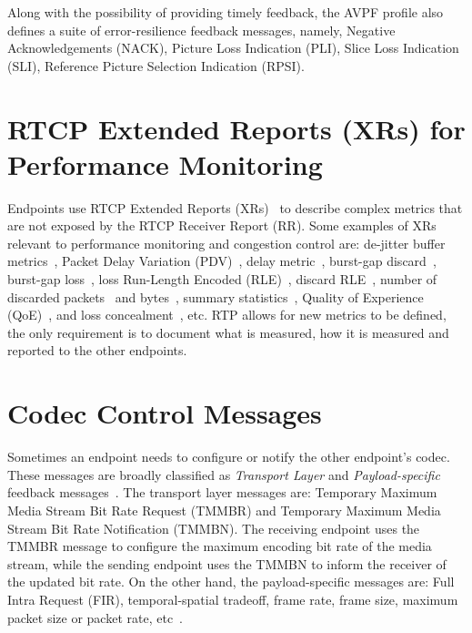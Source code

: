 Along with the possibility of providing timely feedback, the AVPF profile also
defines a suite of error-resilience feedback messages, namely, Negative
Acknowledgements (NACK), Picture Loss Indication (PLI), Slice Loss Indication
(SLI), Reference Picture Selection Indication (RPSI).

\section{RTCP Extended Reports (XRs) for Performance Monitoring}

Endpoints use RTCP Extended Reports (XRs)~\cite{rfc3611} to describe complex
metrics that are not exposed by the RTCP Receiver Report (RR). Some examples
of XRs relevant to performance monitoring and congestion control are:
de-jitter buffer metrics~\cite{draft.xr.jb}, Packet Delay Variation
(PDV)~\cite{rfc6798}, delay metric~\cite{rfc6843}, burst-gap discard~\cite{
draft.xr.bg.discard}, burst-gap loss~\cite{rfc6958}, loss Run-Length Encoded
(RLE)~\cite{rfc3611}, discard RLE~\cite{draft.xr.discard.rle}, number of
discarded packets~\cite{draft.xr.discard} and
bytes~\cite{draft.xr.bytes.discarded}, summary
statistics~\cite{draft.xr.stat}, Quality of Experience
(QoE)~\cite{draft.xr.qoe}, and loss concealment~\cite{draft.xr.conceal}, etc.
RTP allows for new metrics to be defined, the only requirement is to document
what is measured, how it is measured and reported to the other endpoints.




\section{Codec Control Messages}

Sometimes an endpoint needs to configure or notify the other endpoint's codec.
These messages are broadly classified as \emph{Transport Layer} and \emph
{Payload-specific} feedback messages~\cite{rfc5104}. The transport layer
messages are: Temporary Maximum Media Stream Bit Rate Request (TMMBR) and
Temporary Maximum Media Stream Bit Rate Notification (TMMBN). The receiving
endpoint uses the TMMBR message to configure the maximum encoding bit rate of
the media stream, while the sending endpoint uses the TMMBN to inform the
receiver of the updated bit rate. On the other hand, the payload-specific
messages are: Full Intra Request (FIR), temporal-spatial tradeoff, frame
rate, frame size, maximum packet size or packet rate,
etc~\cite{draft.avt.cop}.

